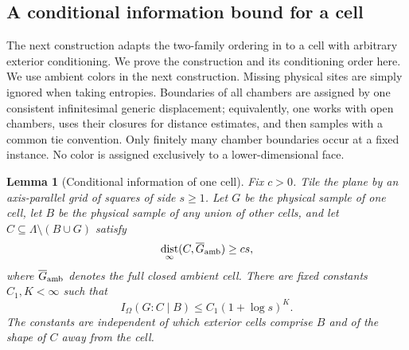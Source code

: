 \documentclass[11pt]{article}
\numberwithin{equation}{section}
\newtheorem{lemma}[theorem]{Lemma}
\theoremstyle{definition}
\theoremstyle{remark}
\DeclareMathOperator{\dist}{dist}
\begin{document}
\subsection{A conditional information bound for a cell}

The next construction adapts the two-family ordering in
\cite[Section~11]{RepoAreaLaw} to a cell with arbitrary exterior conditioning.
We prove the construction and its conditioning order here.
We use ambient colors in the next construction.  Missing physical sites
are simply ignored when taking entropies.  Boundaries of all chambers
are assigned by one consistent infinitesimal generic displacement;
equivalently, one works with open chambers, uses their closures for
distance estimates, and then samples with a common tie convention.
Only finitely many chamber boundaries occur at a fixed instance.  No
color is assigned exclusively to a lower-dimensional face.

\begin{lemma}[Conditional information of one cell]
\label{lem:cell-cmi}
Fix $c>0$.  Tile the plane by an axis-parallel grid of squares of side
$s\ge1$.  Let $G$ be the physical sample of one cell, let $B$ be the
physical sample of any union of other cells, and let
$C\subseteq\Lambda\setminus(B\cup G)$ satisfy
\[
 \dist_\infty(C,\overline{G}_{\rm amb})\ge cs,
\]
where $\overline{G}_{\rm amb}$ denotes the full closed ambient cell.
There are fixed constants $C_1,K<\infty$ such that
\begin{equation}
 I_\Omega(G:C\mid B)\le C_1(1+\log s)^K.
 \label{eq:info-cell-cmi}
\end{equation}
The constants are independent of which exterior cells comprise $B$
and of the shape of $C$ away from the cell.
\end{lemma}
\end{document}
